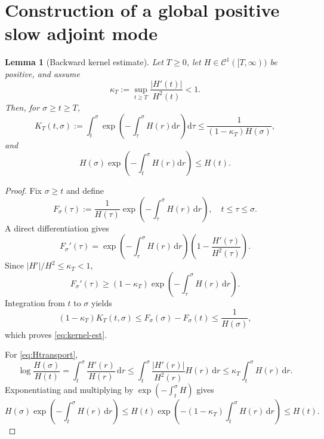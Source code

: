 \documentclass[11pt,reqno]{amsart}
\newtheorem{lemma}[theorem]{Lemma}
\theoremstyle{definition}
\theoremstyle{remark}
\begin{document}
	\section{Construction of a global positive slow adjoint mode} \label{sec:adjoint-mode}
	
	\begin{lemma}[Backward kernel estimate]
		\label{lem:kernel}
		Let $T\geq0$, let $H\in \mathcal{C}^1([T,\infty))$ be positive, and assume
		$$
		\kappa_T:=\sup_{t\geq T}\frac{|H'(t)|}{H^2(t)}<1.
		$$
		Then, for $\sigma\geq t\geq T$,
		\begin{equation}
			\label{eq:kernel-est}
			K_T(t,\sigma):=
			\int_t^\sigma
			\exp\left(-\int_\tau^\sigma H(r)\mathrm{d}r\right)\mathrm{d}\tau
			\leq\frac{1}{(1-\kappa_T)H(\sigma)},
		\end{equation}
		and
		\begin{equation}
			\label{eq:Htransport}
			H(\sigma)
			\exp\left(-\int_t^\sigma H(r)\mathrm{d}r\right)
			\leq H(t).
		\end{equation}
	\end{lemma}
	
	\begin{proof}
		Fix $\sigma\geq t$ and define
		$$
		F_\sigma(\tau):=\frac{1}{H(\tau)}
		\exp\left(-\int_\tau^\sigma H(r)\,\mathrm{d}r\right),
		\quad t\leq\tau\leq\sigma.
		$$
		A direct differentiation gives
		$$
		F_\sigma'(\tau)
		=\exp\left(-\int_\tau^\sigma H(r)\,\mathrm{d}r\right)
		\left(1-\frac{H'(\tau)}{H^2(\tau)}\right).
		$$
		Since $|H'|/H^2\leq\kappa_T<1$,
		$$
		F_\sigma'(\tau)
		\geq(1-\kappa_T)
		\exp\left(-\int_\tau^\sigma H(r)\,\mathrm{d}r\right).
		$$
		Integration from $t$ to $\sigma$ yields
		$$
		(1-\kappa_T)K_T(t,\sigma)
		\leq F_\sigma(\sigma)-F_\sigma(t)
		\leq\frac{1}{H(\sigma)},
		$$
		which proves \eqref{eq:kernel-est}.
		
		For \eqref{eq:Htransport},
		$$
		\log\frac{H(\sigma)}{H(t)}
		=\int_t^\sigma\frac{H'(r)}{H(r)}\,\mathrm{d}r
		\leq\int_t^\sigma\frac{|H'(r)|}{H^2(r)}H(r)\,\mathrm{d}r
		\leq\kappa_T\int_t^\sigma H(r)\,\mathrm{d}r.
		$$
		Exponentiating and multiplying by $\exp(-\int_t^\sigma H)$ gives
		$$
		H(\sigma)\exp\left(-\int_t^\sigma H(r)\,\mathrm{d}r\right)
		\leq H(t)
		\exp\left(-(1-\kappa_T)\int_t^\sigma H(r)\,\mathrm{d}r\right)
		\leq H(t).
		$$
	\end{proof}
	
\end{document}
